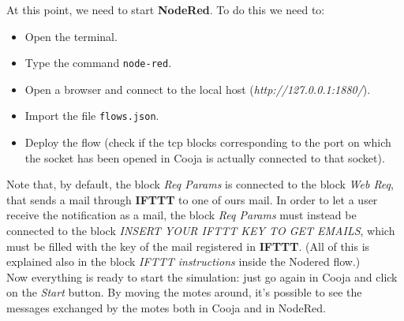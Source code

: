 At this point, we need to start \textbf{NodeRed}. To do this we need to:
\begin{itemize}
    \item Open the terminal.
    \item Type the command \texttt{node-red}.
    \item Open a browser and connect to the local host (\textit{http://127.0.0.1:1880/}).
    \item Import the file \texttt{flows.json}.
    \item Deploy the flow (check if the tcp blocks corresponding to the port on which the socket has been opened in 
            Cooja is actually connected to that socket). 
\end{itemize}
Note that, by default, the block \textit{Req Params} is connected to the block \textit{Web Req}, that sends a mail through
\textbf{IFTTT} to one of ours mail. In order to let a user receive the notification as a mail, the block \textit{Req Params} must
instead be connected to the block \textit{INSERT YOUR IFTTT KEY TO GET EMAILS}, which must be filled with the key of the mail
registered in \textbf{IFTTT}. (All of this is explained also in the block \textit{IFTTT instructions} inside the Nodered flow.)\\ 

Now everything is ready to start the simulation: just go again in Cooja and click on the \textit{Start} button. By moving the 
motes around, it's possible to see the messages exchanged by the motes both in Cooja and in NodeRed.